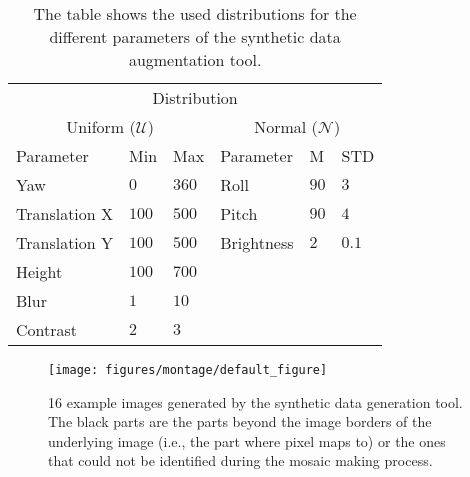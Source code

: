 \begin{table}[h!]
  \centering
  \begin{tabular}{llllll}
    \toprule
    \multicolumn{6}{c}{Distribution}                                                         \\
    \multicolumn{3}{c}{Uniform ($\mathcal{U}$)} & \multicolumn{3}{c}{Normal ($\mathcal{N}$)} \\
    \cmidrule(r){1-3}\cmidrule(r){4-6}
    Parameter                                   & Min   & Max   & Parameter  & M    & STD    \\
    \cmidrule(r){1-3}\cmidrule(r){4-6}
    Yaw                                         & $0$   & $360$ & Roll       & $90$ & $3$    \\
    Translation X                               & $100$ & $500$ & Pitch      & $90$ & $4$    \\
    Translation Y                               & $100$ & $500$ & Brightness & $2$  & $0.1$  \\
    Height                                      & $100$ & $700$ &            &      &        \\
    Blur                                        & $1$   & $10$  &            &      &        \\
    Contrast                                    & $2$   & $3$   &            &      &        \\
    \bottomrule
  \end{tabular}
  \caption[Distributions for the different
  parameters of the synthetic data augmentation tool.]{The table shows the used distributions for the different
    parameters of the synthetic data augmentation tool.}
  \label{tab:distributions}

\end{table}

\begin{figure}[h!]
\begin{center}
\texttt{[image: figures/montage/default\_figure]}
\caption{{\label{fig:montage} 16 example images generated by the synthetic data generation
    tool. The black parts are the parts beyond the image borders of
    the underlying image (i.e., the part where pixel maps to) or the
    ones that could not be identified during the mosaic making
    process.%
}}
\end{center}
\end{figure}